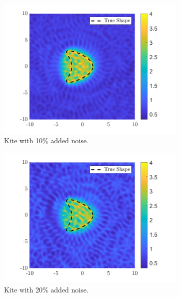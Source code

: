 \documentclass[]{article}
\begin{document}
				\begin{figure}[h]
					\centering
					\begin{subfigure}{.3\textwidth}
						\centering
						\includegraphics[width = \textwidth]{Numeric Simulations/Images/kite-10-noise-reconstructed}
						\caption{Kite with 10\% added noise.}
					\end{subfigure}
					\begin{subfigure}{.3\textwidth}
						\centering
						\includegraphics[width = \textwidth]{Numeric Simulations/Images/kite-20-noise-reconstructed}
						\caption{Kite with 20\% added noise.}
					\end{subfigure}
					\begin{subfigure}{.3\textwidth}

\end{subfigure}
\end{figure}
\end{document}
